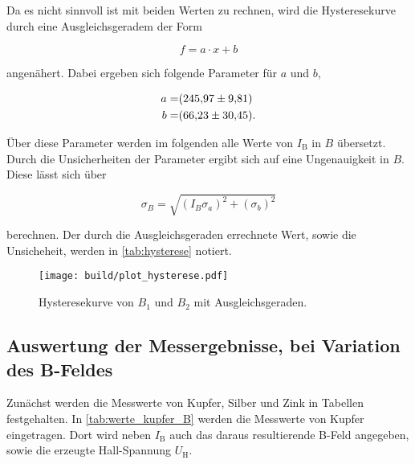 Da es nicht sinnvoll ist mit beiden Werten zu rechnen, wird die Hysteresekurve durch eine Ausgleichsgeradem der Form

\begin{equation}
    f = a \cdot x + b
    \label{eq:gerade}
\end{equation}

angenähert.
Dabei ergeben sich folgende Parameter für $a$ und $b$,

\begin{align}
    a =& \SI{245.97+-9.81}{} \\
    b =& \SI{66.23+-30.45}{}.
    \label{eq:params1}
\end{align}

Über diese Parameter werden im folgenden alle Werte von $I_\text{B}$ in $B$ übersetzt.
Durch die Unsicherheiten der Parameter ergibt sich auf eine Ungenauigkeit in $B$.
Diese lässt sich über

\begin{equation}
    \sigma _B = \sqrt{\left(I_B \sigma _a \right)^2 + \left(\sigma _b \right)^2}
    \label{eq:B_fehler}
\end{equation}

berechnen.
Der durch die Ausgleichsgeraden errechnete Wert, sowie die Unsicheheit, werden in \autoref{tab:hysterese} notiert.

\begin{figure}
    \centering
    \texttt{[image: build/plot\_hysterese.pdf]}
    \caption{Hysteresekurve von $B_1$ und $B_2$ mit Ausgleichsgeraden.\cite{numpy}}
    \label{fig:hysterese_plot}
\end{figure}

\subsection{Auswertung der Messergebnisse, bei Variation des B-Feldes}
\label{ssec:mess}

Zunächst werden die Messwerte von Kupfer, Silber und Zink in Tabellen festgehalten.
In \autoref{tab:werte_kupfer_B} werden die Messwerte von Kupfer eingetragen.
Dort wird neben $I_\text{B}$ auch das daraus resultierende B-Feld angegeben, sowie die erzeugte Hall-Spannung $U_\text{H}$.

